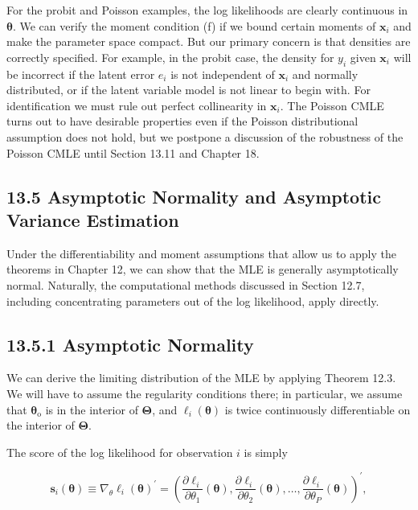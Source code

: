 \documentclass[10pt]{article}
\begin{document}
For the probit and Poisson examples, the log likelihoods are clearly continuous in $\boldsymbol{\theta}$. We can verify the moment condition (f) if we bound certain moments of $\mathbf{x}_{i}$ and make the parameter space compact. But our primary concern is that densities are correctly specified. For example, in the probit case, the density for $y_{i}$ given $\mathbf{x}_{i}$ will be incorrect if the latent error $e_{i}$ is not independent of $\mathbf{x}_{i}$ and normally distributed, or if the latent variable model is not linear to begin with. For identification we must rule out perfect collinearity in $\mathbf{x}_{i}$. The Poisson CMLE turns out to have desirable properties even if the Poisson distributional assumption does not hold, but we postpone a discussion of the robustness of the Poisson CMLE until Section 13.11 and Chapter 18.

\subsection*{13.5 Asymptotic Normality and Asymptotic Variance Estimation}
Under the differentiability and moment assumptions that allow us to apply the theorems in Chapter 12, we can show that the MLE is generally asymptotically normal. Naturally, the computational methods discussed in Section 12.7, including concentrating parameters out of the log likelihood, apply directly.

\subsection*{13.5.1 Asymptotic Normality}
We can derive the limiting distribution of the MLE by applying Theorem 12.3. We will have to assume the regularity conditions there; in particular, we assume that $\boldsymbol{\theta}_{\mathrm{o}}$ is in the interior of $\boldsymbol{\Theta}$, and $\ell_{i}(\boldsymbol{\theta})$ is twice continuously differentiable on the interior of $\boldsymbol{\Theta}$.

The score of the log likelihood for observation $i$ is simply


\begin{equation*}
\mathbf{s}_{i}(\boldsymbol{\theta}) \equiv \nabla_{\theta} \ell_{i}(\boldsymbol{\theta})^{\prime}=\left(\frac{\partial \ell_{i}}{\partial \theta_{1}}(\boldsymbol{\theta}), \frac{\partial \ell_{i}}{\partial \theta_{2}}(\boldsymbol{\theta}), \ldots, \frac{\partial \ell_{i}}{\partial \theta_{P}}(\boldsymbol{\theta})\right)^{\prime}, \tag{13.17}
\end{equation*}
\end{document}
